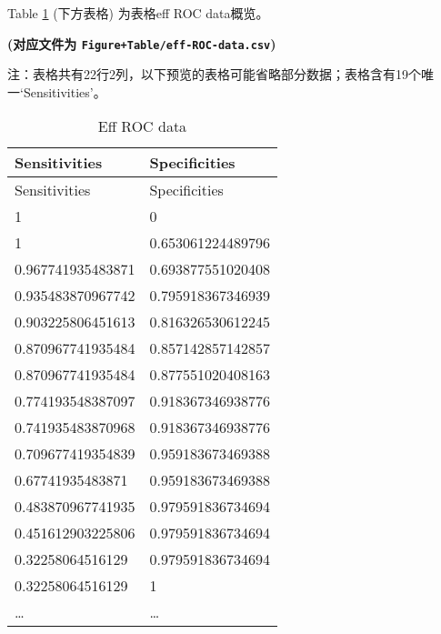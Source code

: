 \documentclass[
]{article}
\begin{document}
Table \ref{tab:eff-ROC-data} (下方表格) 为表格eff ROC data概览。

\textbf{(对应文件为 \texttt{Figure+Table/eff-ROC-data.csv})}

\begin{center}\begin{tcolorbox}[colback=gray!10, colframe=gray!50, width=0.9\linewidth, arc=1mm, boxrule=0.5pt]注：表格共有22行2列，以下预览的表格可能省略部分数据；表格含有19个唯一`Sensitivities'。
\end{tcolorbox}
\end{center}

\begin{longtable}[]{@{}ll@{}}
\caption{\label{tab:eff-ROC-data}Eff ROC data}\tabularnewline
\toprule
Sensitivities & Specificities\tabularnewline
\midrule
\endfirsthead
\toprule
Sensitivities & Specificities\tabularnewline
\midrule
\endhead
1 & 0\tabularnewline
1 & 0.653061224489796\tabularnewline
0.967741935483871 & 0.693877551020408\tabularnewline
0.935483870967742 & 0.795918367346939\tabularnewline
0.903225806451613 & 0.816326530612245\tabularnewline
0.870967741935484 & 0.857142857142857\tabularnewline
0.870967741935484 & 0.877551020408163\tabularnewline
0.774193548387097 & 0.918367346938776\tabularnewline
0.741935483870968 & 0.918367346938776\tabularnewline
0.709677419354839 & 0.959183673469388\tabularnewline
0.67741935483871 & 0.959183673469388\tabularnewline
0.483870967741935 & 0.979591836734694\tabularnewline
0.451612903225806 & 0.979591836734694\tabularnewline
0.32258064516129 & 0.979591836734694\tabularnewline
0.32258064516129 & 1\tabularnewline
\ldots{} & \ldots{}\tabularnewline
\bottomrule
\end{longtable}
\end{document}
